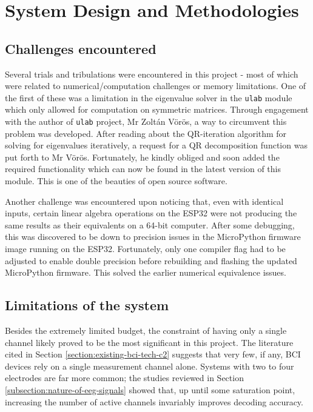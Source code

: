 \section{System Design and Methodologies}

\subsection{Challenges encountered}
Several trials and tribulations were encountered in this project - most of which were related to numerical/computation challenges or memory limitations. One of the first of these was a limitation in the eigenvalue solver in the \texttt{ulab} module which only allowed for computation on symmetric matrices. Through engagement with the author of \texttt{ulab} project, Mr Zoltán Vörös, a way to circumvent this problem was developed. After reading about the QR-iteration algorithm for solving for eigenvalues iteratively, a request for a QR decomposition function was put forth to Mr Vörös. Fortunately, he kindly obliged and soon added the required functionality which can now be found in the latest version of this module. This is one of the beauties of open source software.

Another challenge was encountered upon noticing that, even with identical inputs, certain linear algebra operations on the ESP32 were not producing the same results as their equivalents on a 64-bit computer. After some debugging, this was discovered to be down to precision issues in the MicroPython firmware image running on the ESP32. Fortunately, only one compiler flag had to be adjusted to enable double precision before rebuilding and flashing the updated MicroPython firmware. This solved the earlier numerical equivalence issues. 

\subsection{Limitations of the system}
\label{subsection:syst-limitations-discuss}
Besides the extremely limited budget, the constraint of having only a single channel likely proved to be the most significant in this project. The literature cited in Section \ref{section:existing-bci-tech-c2} suggests that very few, if any, BCI devices rely on a single measurement channel alone. Systems with two to four electrodes are far more common; the studies reviewed in Section \ref{subsection:nature-of-eeg-signals} showed that, up until some saturation point, increasing the number of active channels invariably improves decoding accuracy. 


